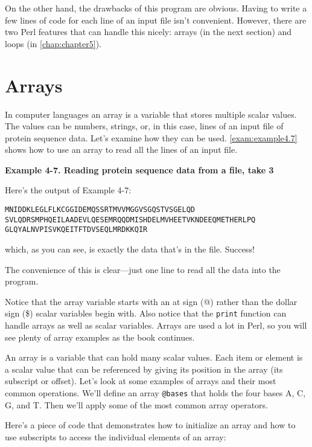 On the other hand, the drawbacks of this program are obvious. Having to write a few lines of code for each line of an input file isn't convenient. However, there are two Perl features that can handle this nicely: arrays (in the next section) and loops (in \autoref{chap:chapter5}). 

\section{Arrays}
In computer languages an array is a variable that stores multiple scalar values. The values can be numbers, strings, or, in this case, lines of an input file of protein sequence data. Let's examine how they can be used. \autoref{exam:example4.7} shows how to use an array to read all the lines of an input file.

\textbf{Example 4-7. Reading protein sequence data from a file, take 3}



Here's the output of Example 4-7:

\begin{lstlisting}
MNIDDKLEGLFLKCGGIDEMQSSRTMVVMGGVSGQSTVSGELQD
SVLQDRSMPHQEILAADEVLQESEMRQQDMISHDELMVHEETVKNDEEQMETHERLPQ
GLQYALNVPISVKQEITFTDVSEQLMRDKKQIR
\end{lstlisting}

which, as you can see, is exactly the data that's in the file. Success!

The convenience of this is clear—just one line to read all the data into the program. 

Notice that the array variable starts with an at sign (@) rather than the dollar sign (\$) scalar variables begin with. Also notice that the \verb|print| function can handle arrays as well as scalar variables. Arrays are used a lot in Perl, so you will see plenty of array examples as the book continues.  

An array is a variable that can hold many scalar values. Each item or element is a scalar value that can be referenced by giving its position in the array (its subscript or offset). Let's look at some examples of arrays and their most common operations. We'll define an array \verb|@bases| that holds the four bases A, C, G, and T. Then we'll apply some of the most common array operators.

Here's a piece of code that demonstrates how to initialize an array and how to use subscripts to access the individual elements of an array: 


